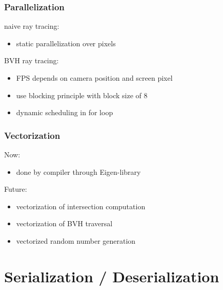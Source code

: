 \documentclass[aspectratio=169]{beamer}
\begin{document}
  \begin{frame}
    \frametitle{Parallelization}
    naive ray tracing:
    \begin{itemize}
      \item static parallelization over pixels
    \end{itemize}
    \bigskip
    BVH ray tracing:
    \begin{itemize}
      \item FPS depends on camera position and screen pixel
      \item use blocking principle with block size of 8
      \item dynamic scheduling in for loop
    \end{itemize}
  \end{frame}
  \begin{frame}
    \frametitle{Vectorization}
    Now:
    \begin{itemize}
      \item done by compiler through Eigen-library
    \end{itemize}
    \bigskip
    Future:
    \begin{itemize}
      \item vectorization of intersection computation
      \item vectorization of BVH traversal
      \item vectorized random number generation
    \end{itemize}
  \end{frame}

  \section{Serialization / Deserialization} %
  \label{sec:camera_paths}
\end{document}
